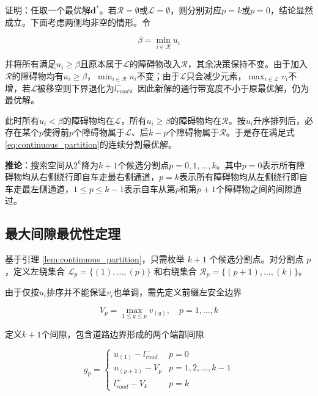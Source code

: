 证明：任取一个最优解$\mathbf{d}^{*}$。若$\mathcal{R}=\emptyset$或$\mathcal{L}=\emptyset$，则分别对应$p=k$或$p=0$，结论显然成立。下面考虑两侧均非空的情形。令

\begin{equation}
    \beta = \min_{i\in\mathcal{R}} u_i
\end{equation}

并将所有满足$u_i \geq \beta$且原本属于$\mathcal{L}$的障碍物改入$\mathcal{R}$，其余决策保持不变。由于加入$\mathcal{R}$的障碍物均有$u_i \geq \beta$，$\min_{i\in\mathcal{R}}u_i$不变；由于$\mathcal{L}$只会减少元素，$\max_{i\in\mathcal{L}}v_i$不增，若$\mathcal{L}$被移空则下界退化为$l_{road}^{-}$。因此新解的通行带宽度不小于原最优解，仍为最优解。

此时所有$u_i < \beta$的障碍物均在$\mathcal{L}$，所有$u_i \geq \beta$的障碍物均在$\mathcal{R}$。按$u_i$升序排列后，必存在某个$p$使得前$p$个障碍物属于$\mathcal{L}$、后$k-p$个障碍物属于$\mathcal{R}$。于是存在满足式\eqref{eq:continuous_partition}的连续分割最优解。

\textbf{推论}：搜索空间从$2^k$降为$k+1$个候选分割点$p = 0, 1, \ldots, k$。其中$p = 0$表示所有障碍物均从右侧绕行即自车走最右侧通道，$p = k$表示所有障碍物均从左侧绕行即自车走最左侧通道，$1 \leq p \leq k-1$表示自车从第$p$和第$p+1$个障碍物之间的间隙通过。

\subsection{最大间隙最优性定理}
基于引理 \ref{lem:continuous_partition}，只需枚举 $k+1$ 个候选分割点。对分割点 $p$，定义左绕集合 $\mathcal{L}_p = \{(1), \ldots, (p)\}$ 和右绕集合 $\mathcal{R}_p = \{(p+1), \ldots, (k)\}$。

由于仅按$u_i$排序并不能保证$v_i$也单调，需先定义前缀左安全边界

\begin{equation}
    V_p = \max_{1\leq q\leq p} v_{(q)}, \quad p=1,\ldots,k
    \label{eq:prefix_v}
\end{equation}

定义$k+1$个间隙，包含道路边界形成的两个端部间隙

\begin{equation}
    g_p = \begin{cases}
        u_{(1)} - l_{road}^{-} & p = 0 \\[0.3em]
        u_{(p+1)} - V_p & p = 1, 2, \ldots, k-1 \\[0.3em]
        l_{road}^{+} - V_k & p = k
    \end{cases}
    \label{eq:gap_def}
\end{equation}

